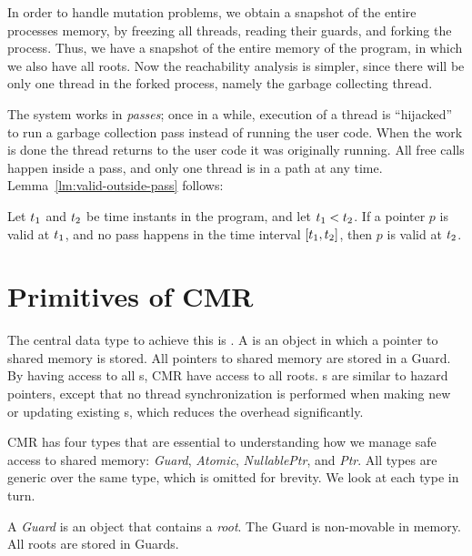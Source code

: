 In order to handle mutation problems, we obtain a snapshot of the entire processes memory, by
freezing all threads, reading their guards, and forking the process. Thus, we have a snapshot of
the entire memory of the program, in which we also have all roots. Now the reachability analysis is
simpler, since there will be only one thread in the forked process, namely the garbage collecting
thread.

The system works in \emph{passes}; once in a while, execution of a thread is ``hijacked'' to
run a garbage collection pass instead of running the user code.
When the work is done the thread returns to the user code it was
originally running. All free calls happen inside a pass, and only one thread is in a path at any
time. Lemma~\ref{lm:valid-outside-pass} follows:
\begin{lemma}\label{lm:valid-outside-pass}
  Let $t\sb{1}$ and $t\sb{2}$ be time instants in the program, and let $t\sb{1} < t\sb{2}$.
  If a pointer $p$ is valid at $t\sb{1}$, and no pass happens in the time interval
  $[t\sb{1}, t\sb{2}]$, then $p$ is valid at $t\sb{2}$.
\end{lemma}






\section{Primitives of CMR\label{sec:cmr-primitives}}

The central data type to achieve this is . A  is an object in which a
pointer to shared memory is stored. All pointers to shared memory are stored in a Guard. By
having access to all s, CMR have access to all roots. s are similar to
hazard pointers, except that no thread synchronization is performed when making new or updating
existing s, which reduces the overhead significantly.

CMR has four types that are essential to understanding how we manage safe access to shared memory:
\emph{Guard}, \emph{Atomic}, \emph{NullablePtr}, and \emph{Ptr}. All types are generic over the
same type, which is omitted for brevity. We look at each type in turn.

\begin{definition}[Guard]
  A \emph{Guard} is an object that contains a \emph{root}. The Guard is non-movable in memory.
  All roots are stored in Guards.
\end{definition}

